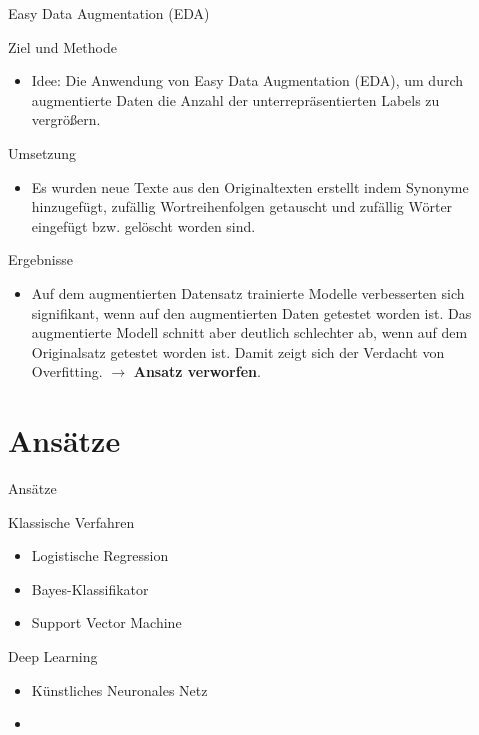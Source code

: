 \documentclass[aspectratio=169]{beamer} %
\begin{document}
\begin{frame}{Easy Data Augmentation (EDA)}
    \begin{block}{Ziel und Methode}
        \begin{itemize}
            \item Idee: Die Anwendung von Easy Data Augmentation (EDA), um durch augmentierte Daten die Anzahl der unterrepräsentierten Labels zu vergrößern.
        \end{itemize}
    \end{block}

    \begin{block}{Umsetzung}
        \begin{itemize}
            \item Es wurden neue Texte aus den Originaltexten erstellt indem Synonyme hinzugefügt, zufällig Wortreihenfolgen getauscht und zufällig Wörter eingefügt bzw. gelöscht worden sind.
        \end{itemize}
    \end{block}

    \begin{alertblock}{Ergebnisse}
        \begin{itemize}
            \item Auf dem augmentierten Datensatz trainierte Modelle verbesserten sich signifikant, wenn auf den augmentierten Daten getestet worden ist. Das augmentierte Modell schnitt aber deutlich schlechter ab, wenn auf dem Originalsatz getestet worden ist. Damit zeigt sich der Verdacht von Overfitting. $\to$ \textbf{Ansatz verworfen}.
        \end{itemize}
    \end{alertblock}
\end{frame}

\section{Ansätze}

\begin{frame}{Ansätze}
    \begin{block}{Klassische Verfahren}
        \begin{itemize}
            \item Logistische Regression
            \item Bayes-Klassifikator
            \item Support Vector Machine
        \end{itemize}
    \end{block}
    \begin{block}{Deep Learning}
        \begin{itemize}
            \item Künstliches Neuronales Netz
            \item {}
        \end{itemize}
    \end{block}
\end{frame}
\end{document}
